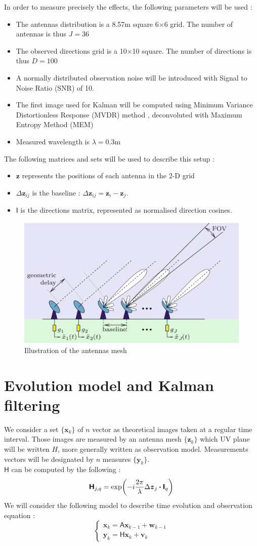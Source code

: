 \documentclass[titlepage,11pt]{article}
\newcommand{\w}{\boldsymbol{w}}
\renewcommand{\v}{\boldsymbol{v}}
\renewcommand{\H}{\boldsymbol{\mathsf{H}}}
\newcommand{\A}{\boldsymbol{\mathsf{A}}}
\newcommand{\I}{\boldsymbol{\mathsf{I}}}
\newcommand{\x}{\boldsymbol{x}}
\newcommand{\y}{\boldsymbol{y}}
\newcommand{\z}{\boldsymbol{z}}
\newcommand{\dz}{\Delta\boldsymbol{z}}
\begin{document}
	In order to measure precisely the effects, the following parameters will be used :
	\begin{itemize}
		\item The antennas distribution is a 8.57m square 6$\times$6 grid. The number of antennas is thus $J = 36$
		\item The observed directions grid is a 10$\times$10 square. The number of directions is thus $D=100$
		\item A normally distributed observation noise will be introduced with Signal to Noise Ratio (SNR) of 10. 
		\item The first image used for Kalman will be computed using Minimum Variance Distortionless Response (MVDR) method \cite{bible}, deconvoluted with Maximum Entropy Method (MEM) \cite{MEM}
		\item Measured wavelength is $\lambda =0.3$m
	\end{itemize}

	The following matrices and sets will be used to describe this setup :
	\begin{itemize}
		\item $\z$ represents the positions of each antenna in the 2-D grid
		\item $\dz_{ij}$ is the baseline : $\dz_{ij} = \z_i - \z_j$. 
		\item $\I$ is the directions matrix, represented as normalised direction cosines.
	\end{itemize}

	\begin{figure}[H]
		\centering
		\includegraphics[width=.5\linewidth]{src/antennes}
		\caption{Illustration of the antennas mesh}
	\end{figure}
		
	\section{Evolution model and Kalman filtering}
	
	We consider a set $\{\x_k\}$ of $n$ vector as theoretical images taken at a regular time interval. Those images are measured by an antenna mesh $\{\z_k\}$ which UV plane will be written $H$, more generally written as observation model. Measurements vectors will be designated by $n$ measures $\{\y_k\}$.\\
	$\H$ can be computed by the following :
	\begin{equation}
		\H_{j,q} = \exp(-i\frac{2\pi}{\lambda}\dz_{j}\dotproduct\I_q)
	\end{equation}
	We will consider the following model to describe time evolution and observation equation :
	$$
		\begin{cases}
			\x_k = \A\x_{k-1} + \w_{k-1}\\
			\y_k = \H\x_k + \v_k
		\end{cases}
	$$
	
\end{document}
